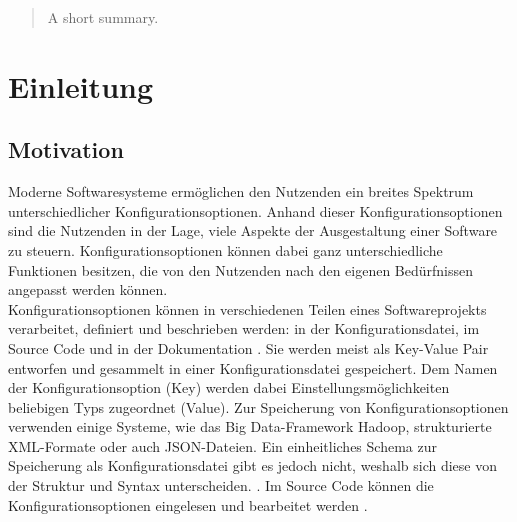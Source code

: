 \documentclass[german,bachelor]{swsLeipzig}
\begin{document}
\begin{frontmatter}
  \begin{abstract}
    A short summary.
  \end{abstract}

  \tableofcontents


  \listoffigures %

  \listoftables %


\end{frontmatter}

\chapter{Einleitung}\label{Einleitung}

\section{Motivation}
Moderne Softwaresysteme erm\"oglichen den Nutzenden ein breites Spektrum unterschiedlicher Konfigurationsoptionen.
Anhand dieser Konfigurationsoptionen sind die Nutzenden in der Lage, viele Aspekte der Ausgestaltung einer Software zu steuern.
Konfigurationsoptionen k\"onnen dabei ganz unterschiedliche Funktionen besitzen, die von den Nutzenden nach den eigenen Bed\"urfnissen angepasst werden k\"onnen.\\

Konfigurationsoptionen können in verschiedenen Teilen eines Softwareprojekts verarbeitet, definiert und beschrieben werden:
in der Konfigurationsdatei, im Source Code und in der Dokumentation \cite[S. 185]{7774519}.
Sie werden meist als Key-Value Pair entworfen und gesammelt in einer Konfigurationsdatei gespeichert.
Dem Namen der Konfigurationsoption (Key) werden dabei Einstellungsmöglichkeiten beliebigen Typs zugeordnet (Value).
Zur Speicherung von Konfigurationsoptionen verwenden einige Systeme, wie das Big Data-Framework Hadoop, strukturierte XML-Formate oder auch JSON-Dateien.
Ein einheitliches Schema zur Speicherung als Konfigurationsdatei gibt es jedoch nicht, weshalb sich diese von der Struktur und Syntax unterscheiden. \cite[S. 131]{10.1145/1985793.1985812}.
Im Source Code können die Konfigurationsoptionen eingelesen und bearbeitet werden \cite[S. 185]{7774519}.\\
\end{document}
